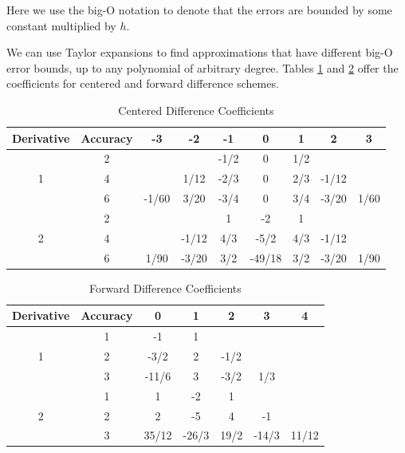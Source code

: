Here we use the big-O notation to denote that the errors are bounded by some constant multiplied by $h$.

We can use Taylor expansions to find approximations that have different big-O error bounds, up to any polynomial of arbitrary degree. Tables \ref{Table:CDiff} and \ref{Table:FDiff} offer the coefficients for centered and forward difference schemes.

\begin{table}
\begin{center}
\begin{tabular}{|c|c|c|c|c|c|c|c|c|}
\hline
Derivative & Accuracy & -3 & -2 & -1 & 0 & 1 & 2 & 3 \\ \hline
 & 2 & & & -1/2 & 0 & 1/2 & & \\ \cline{2-9}
 1 & 4 & & 1/12 & -2/3 &  0 & 2/3 & -1/12 & \\ \cline{2-9}
  & 6 & -1/60 & 3/20 & -3/4 & 0 & 3/4 & -3/20 & 1/60 \\ \hline
  & 2 & & & 1 & -2 & 1 & & \\ \cline{2-9}
 2 & 4 & & -1/12 & 4/3 &  -5/2 & 4/3 & -1/12 & \\ \cline{2-9}
  & 6 & 1/90 & -3/20 & 3/2 & -49/18 & 3/2 & -3/20 & 1/90 \\ \hline
\end{tabular}
\caption{Centered Difference Coefficients}
\label{Table:CDiff}
\end{center}
\end{table}

\begin{table}
\begin{center}
\begin{tabular}{|c|c|c|c|c|c|c|}
\hline
Derivative & Accuracy & 0 & 1 & 2 & 3 & 4 \\ \hline
 & 1 & -1 & 1 &  & &  \\ \cline{2-7}
 1 & 2 & -3/2 & 2 & -1/2 & &  \\ \cline{2-7}
  & 3 & -11/6 & 3 & -3/2 & 1/3 &  \\ \hline
  & 1 & 1 & -2 & 1 &  & \\ \cline{2-7}
 2 & 2 & 2 & -5 & 4 &  -1 &  \\ \cline{2-7}
  & 3 & 35/12 & -26/3 & 19/2 & -14/3 & 11/12 \\ \hline
\end{tabular}
\caption{Forward Difference Coefficients}
\label{Table:FDiff}
\end{center}
\end{table}

